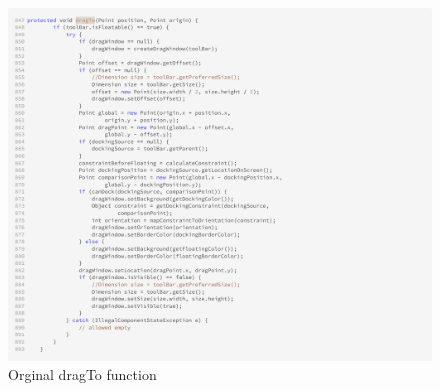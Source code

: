 \begin{figure}[H]
    \centering
    \includegraphics[width=\linewidth]{pic/dragTo.png}
    \caption{Orginal dragTo function}
    \label{fig:Orginal dragTo function}
\end{figure}




